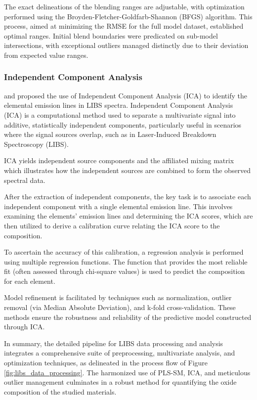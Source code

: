 The exact delineations of the blending ranges are adjustable, with optimization performed using the Broyden-Fletcher-Goldfarb-Shannon (BFGS) algorithm. This process, aimed at minimizing the RMSE for the full model dataset, established optimal ranges. Initial blend boundaries were predicated on sub-model intersections, with exceptional outliers managed distinctly due to their deviation from expected value ranges.

\subsubsection{Independent Component Analysis}\label{sec:ica}
\citet{cleggRecalibrationMarsScience2017} and \cite{forniIndependentComponentAnalysis2013} proposed the use of Independent Component Analysis (ICA) to identify the elemental emission lines in LIBS spectra. Independent Component Analysis (ICA) is a computational method used to separate a multivariate signal into additive, statistically independent components, particularly useful in scenarios where the signal sources overlap, such as in Laser-Induced Breakdown Spectroscopy (LIBS).

ICA yields independent source components and the affiliated mixing matrix which illustrates how the independent sources are combined to form the observed spectral data.

After the extraction of independent components, the key task is to associate each independent component with a single elemental emission line. This involves examining the elements' emission lines and determining the ICA scores, which are then utilized to derive a calibration curve relating the ICA score to the composition.

To ascertain the accuracy of this calibration, a regression analysis is performed using multiple regression functions. The function that provides the most reliable fit (often assessed through chi-square values) is used to predict the composition for each element.

Model refinement is facilitated by techniques such as normalization, outlier removal (via Median Absolute Deviation), and k-fold cross-validation. These methods ensure the robustness and reliability of the predictive model constructed through ICA.

In summary, the detailed pipeline for LIBS data processing and analysis integrates a comprehensive suite of preprocessing, multivariate analysis, and optimization techniques, as delineated in the process flow of Figure \ref{fig:libs_data_processing}.
The harmonized use of PLS-SM, ICA, and meticulous outlier management culminates in a robust method for quantifying the oxide composition of the studied materials.